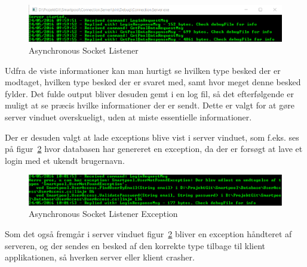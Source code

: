 \begin{figure}
\centering
\includegraphics[width=0.9\linewidth]{figs/connection/asynchronousSocketListener.png}
\caption{Asynchronous Socket Listener}
\label{fig:asynchronousSocketListener}
\end{figure}
	
Udfra de viste informationer kan man hurtigt se hvilken type besked der er modtaget, hvilken type besked der er svaret med, samt hvor meget denne besked fylder. Det fulde output bliver desuden gemt i en log fil, så det efterfølgende er muligt at se præcis hvilke informationer der er sendt. Dette er valgt for at gøre server vinduet overskueligt, uden at miste essentielle informationer.

Der er desuden valgt at lade exceptions blive vist i server vinduet, som f.eks. ses på figur~\ref{fig:asynchronousSocketListenerException} hvor databasen har genereret en exception, da der er forsøgt at lave et login med et ukendt brugernavn.

\begin{figure}
\centering
\includegraphics[width=0.9\linewidth]{figs/connection/asynchronousSocketListenerException.png}
\caption{Asynchronous Socket Listener Exception}
\label{fig:asynchronousSocketListenerException}
\end{figure}

Som det også fremgår i server vinduet figur~\ref{fig:asynchronousSocketListenerException} bliver en exception håndteret af serveren, og der sendes en besked af den korrekte type tilbage til klient applikationen, så hverken server eller klient crasher.

